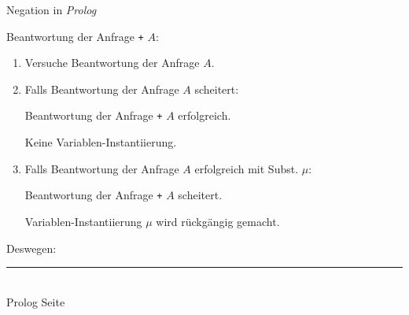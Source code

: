 \documentclass{slides}
\newcommand{\myrule}{\rule{20cm}{1mm}\\ }
\newcounter{mypage}
\begin{document}
\begin{slide}{}
\normalsize
\begin{center}
Negation in \textsl{Prolog}
\end{center}
\vspace{0.5cm}

\footnotesize
Beantwortung der Anfrage \quad \texttt{+} $A$:
\begin{enumerate}
\item Versuche Beantwortung der Anfrage $A$.
\item Falls Beantwortung der Anfrage $A$ scheitert: 

      Beantwortung der Anfrage \texttt{+} $A$ erfolgreich.  

      Keine Variablen-Instantiierung.
\item Falls Beantwortung der Anfrage $A$ erfolgreich mit Subst. $\mu$:

      Beantwortung der Anfrage \texttt{+} $A$ scheitert.

      Variablen-Instantiierung $\mu$ wird r\"{u}ckg\"{a}ngig gemacht.
\end{enumerate}

Deswegen:




\vspace*{\fill}
\tiny \addtocounter{mypage}{1}
\myrule
Prolog  \hspace*{\fill} Seite 
\end{slide}

\end{document}
